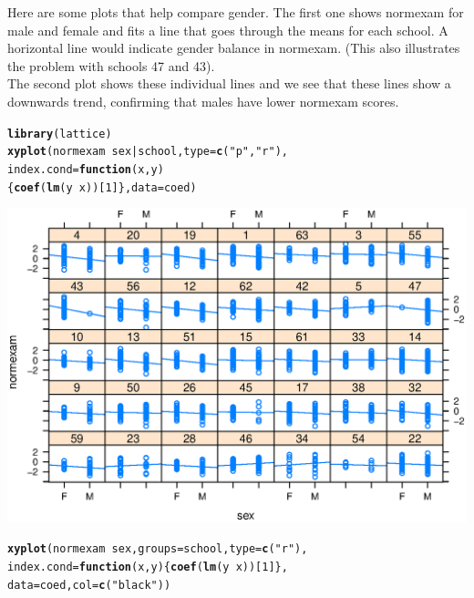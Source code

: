 \documentclass{article}\usepackage{graphicx, color}
\makeatletter
\newcommand{\hlfunctioncall}[1]{\textcolor[rgb]{0.501960784313725,0,0.329411764705882}{\textbf{#1}}}%
\newcommand{\hlstring}[1]{\textcolor[rgb]{0.6,0.6,1}{#1}}%
\newenvironment{kframe}{%
 \def\at@end@of@kframe{}%
 \ifinner\ifhmode%
  \def\at@end@of@kframe{\end{minipage}}%
  \begin{minipage}{\columnwidth}%
 \fi\fi%
 \def\FrameCommand##1{\hskip\@totalleftmargin \hskip-\fboxsep
 \colorbox{shadecolor}{##1}\hskip-\fboxsep
     \hskip-\linewidth \hskip-\@totalleftmargin \hskip\columnwidth}%
 \MakeFramed {\advance\hsize-\width
   \@totalleftmargin\z@ \linewidth\hsize
   \@setminipage}}%
 {\par\unskip\endMakeFramed%
 \at@end@of@kframe}
\newenvironment{knitrout}{}{} %
\makeatother
\begin{document}
Here are some plots that help compare gender. The first one shows normexam for male and female and fits a line that goes through the means for each school. A horizontal line would indicate gender balance in normexam. (This also illustrates the problem with schools 47 and 43).\\
The second plot shows these individual lines and we see that these lines show a downwards trend, confirming that males have lower normexam scores.
\begin{knitrout}
\color{fgcolor}\begin{kframe}
\begin{alltt}
\hlfunctioncall{library}(lattice)
\hlfunctioncall{xyplot}(normexam ~ sex | school, type=\hlfunctioncall{c}(\hlstring{"p"}, \hlstring{"r"}), 
       index.cond=\hlfunctioncall{function}(x,y) 
           \{\hlfunctioncall{coef}(\hlfunctioncall{lm}(y ~ x))[1]\}, data=coed)
\end{alltt}
\end{kframe}

{\centering \includegraphics[width=\linewidth]{plots/unnamed-chunk-241} 

}


\begin{kframe}\begin{alltt}
\hlfunctioncall{xyplot}(normexam ~ sex , groups=school, type=\hlfunctioncall{c}(\hlstring{"r"}), 
       index.cond=\hlfunctioncall{function}(x,y) \{\hlfunctioncall{coef}(\hlfunctioncall{lm}(y ~ x))[1]\}, 
       data=coed, col = \hlfunctioncall{c}(\hlstring{"black"}))
\end{alltt}
\end{kframe}


\end{knitrout}
\end{document}
